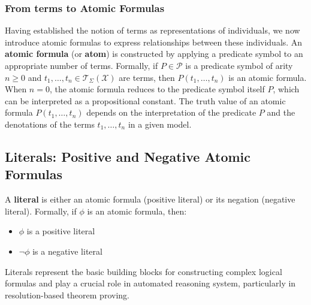 \documentclass[a4paper]{article}
\theoremstyle{definition}
\begin{document}
\subsubsection{From terms to Atomic Formulas}
Having established the notion of terms as representations of individuals, we now introduce atomic 
formulas to express relationships between these individuals. An \textbf{atomic formula} (or \textbf{atom}) is 
constructed by applying a predicate symbol to an appropriate number of terms.
\vspace{1em}
\noindent
\newline
Formally, if \( P \in \mathcal{P} \) is a predicate symbol of arity \( n \geq 0 \) and \( t_1, \ldots, t_n \in \mathcal{T}_{\Sigma} (\mathcal{X}) \) are terms,
then \( P(t_1,\ldots,t_n) \) is an atomic formula. When \( n = 0 \), the atomic formula reduces to the predicate 
symbol itself \( P \), which can be interpreted as a propositional constant.
\vspace{1em}
\noindent
\newline
The truth value of an atomic formula \( P(t_1,\ldots,t_n) \) depends on the interpretation of the predicate 
\( P \) and the denotations of the terms \( t_1,\ldots,t_n \) in a given model.
\subsection{Literals: Positive and Negative Atomic Formulas}
A \textbf{literal} is either an atomic formula (positive literal) or its negation (negative literal).
Formally, if \( \phi \) is an atomic formula, then:
\begin{itemize}
	\item \( \phi \) is a positive literal 
	\item \( \lnot \phi \) is a negative literal
\end{itemize}
Literals represent the basic building blocks for constructing complex logical formulas 
and play a crucial role in automated reasoning system, particularly in resolution-based theorem proving.
\end{document}
